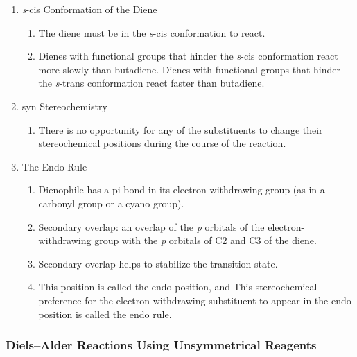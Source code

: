 \begin{enumerate}
    \item \textit{s}-cis Conformation of the Diene
    \begin{enumerate}
        \item The diene must be in the \textit{s}-cis conformation to react.
        \item Dienes with functional groups that hinder the \textit{s}-cis conformation react more slowly than butadiene. Dienes with functional groups that hinder the \textit{s}-trans conformation react faster than butadiene.
    \end{enumerate}
    
    \item syn Stereochemistry
    \begin{enumerate}
        \item There is no opportunity for any of the substituents to change their stereochemical positions during the course of the reaction.
    \end{enumerate}
    
    \item The Endo Rule
    \begin{enumerate}
        \item Dienophile has a pi bond in its electron-withdrawing group (as in a carbonyl group or a cyano group).
        
        \item Secondary overlap: an overlap of the \textit{p} orbitals of the electron-withdrawing group with the \textit{p} orbitals of C2 and C3 of the diene. 
        
        \item Secondary overlap helps to stabilize the transition state.
        
        \item This position is called the endo position, and This stereochemical preference for the electron-withdrawing substituent to appear in the endo position is called the endo rule.
    \end{enumerate}
\end{enumerate}

\subsubsection{Diels–Alder Reactions Using Unsymmetrical Reagents}

